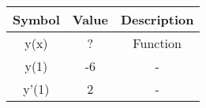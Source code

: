 \begin{tabular}{|c|c|c|}
    \hline
    Symbol & Value & Description \\
    \hline
    y(x) & ? & Function\\
    \hline
    y(1) & -6 & - \\
    \hline 
    y'(1) & 2 & - \\
    \hline 
\end{tabular}
